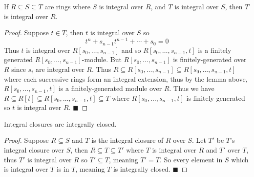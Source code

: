 \documentclass[10pt]{article}
\def\qed{%
    \ifmmode%
        \eqno\blacksquare%
    \else%
        \hskip1cm\allowbreak\hbox{}\nobreak\hfill$\blacksquare$%
    \fi%
}
\begin{document}
\begin{prop*}

    If $R\subseteq S\subseteq T$ are rings where $S$ is integral over $R$, and $T$ is integral over $S$, then $T$ is integral over $R$.

\end{prop*}

\begin{proof}

    Suppose $t\in T$, then $t$ is integral over $S$ so
    \[ t^n + s_{n-1}t^{n-1} + \cdots + s_0 = 0 \]
    Thus $t$ is integral over $R[s_0,\dots,s_{n-1}]$ and so $R[s_0,\dots,s_{n-1},t]$ is a finitely generated $R[s_0,\dots,s_{n-1}]$-module.
    But $R[s_0,\dots,s_{n-1}]$ is finitely-generated over $R$ since $s_i$ are integral over $R$.
    Thus $R\subseteq R[s_0,\dots,s_{n-1}]\subseteq R[s_0,\dots,s_{n-1},t]$ where each successive rings form an integral extension, thus by the lemma above, $R[s_0,\dots,s_{n-1},t]$ is a finitely-generated
    module over $R$.
    Thus we have $R\subseteq R[t]\subseteq R[s_0,\dots,s_{n-1},t]\subseteq T$ where $R[s_0,\dots,s_{n-1},t]$ is finitely-generated so $t$ is integral over $R$.
    \qed

\end{proof}

\begin{prop*}

    Integral closures are integrally closed.

\end{prop*}

\begin{proof}

    Suppose $R\subseteq S$ and $T$ is the integral closure of $R$ over $S$.
    Let $T'$ be $T$'s integral closure over $S$, then $R\subseteq T\subseteq T'$ where $T$ is integral over $R$ and $T'$ over $T$, thus $T'$ is integral over $R$ so $T'\subseteq T$, meaning $T'=T$.
    So every element in $S$ which is integral over $T$ is in $T$, meaning $T$ is integrally closed.
    \qed

\end{proof}
\end{document}
